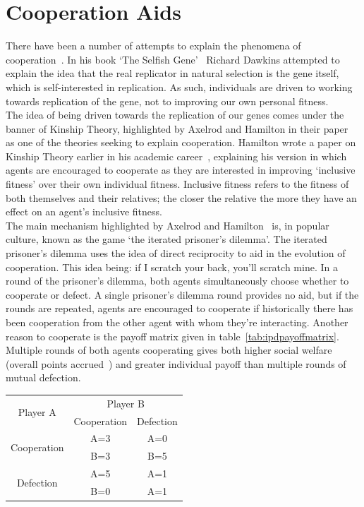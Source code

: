 \documentclass[]{final_report}
\begin{document}
\section{Cooperation Aids}
There have been a number of attempts to explain the phenomena of cooperation~\cite{kropotkin1902mutual, selfish_gene, evolution_of_cooperation, five_rules_coop}. In his book `The Selfish Gene'~\cite{selfish_gene} Richard Dawkins attempted to explain the idea that the real replicator in natural selection is the gene itself, which is self-interested in replication. As such, individuals are driven to working towards replication of the gene, not to improving our own personal fitness.\\
The idea of being driven towards the replication of our genes comes under the banner of Kinship Theory, highlighted by Axelrod and Hamilton in their paper~\cite{evolution_of_cooperation} as one of the theories seeking to explain cooperation. Hamilton wrote a paper on Kinship Theory earlier in his academic career~\cite{kinhamilton}, explaining his version in which agents are encouraged to cooperate as they are interested in improving `inclusive fitness' over their own individual fitness. Inclusive fitness refers to the fitness of both themselves and their relatives; the closer the relative the more they have an effect on an agent's inclusive fitness.\\
The main mechanism highlighted by Axelrod and Hamilton~\cite{evolution_of_cooperation} is, in popular culture, known as the game `the iterated prisoner's dilemma'. The iterated prisoner's dilemma uses the idea of direct reciprocity to aid in the evolution of cooperation. This idea being: if I scratch your back, you'll scratch  mine. In a round of the prisoner's dilemma, both agents simultaneously choose whether to cooperate or defect. A single prisoner's dilemma round provides no aid, but if the rounds are repeated, agents are encouraged to cooperate if historically there has been cooperation from the other agent with whom they're interacting. Another reason to cooperate is the payoff matrix given in table~\ref{tab:ipdpayoffmatrix}. Multiple rounds of both agents cooperating gives both higher social welfare (overall points accrued~\cite{kostas_deductive}) and greater individual payoff than multiple rounds of mutual defection.
\begin{framed}
	\begin{center}
		\begin{tabular}{c|c|c}
		\multirow{2}{*}{Player A} & \multicolumn{2}{c}{Player B}\\		
		& Cooperation & Defection\\
		\hline
		\multirow{2}{*}{Cooperation} & A=3 & A=0\\
		& B=3 & B=5\\
		\hline
		\multirow{2}{*}{Defection} & A=5 & A=1\\
		& B=0 & A=1\\
		\end{tabular}
		\label{tab:ipdpayoffmatrix}
	\end{center}	
\end{framed}
\end{document}
